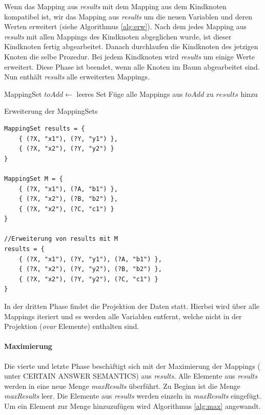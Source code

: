 \documentclass[draft,final]{vutinfth} %
\begin{document}
Wenn das Mapping aus \textit{results} mit dem Mapping aus dem Kindknoten kompatibel ist, wir das Mapping aus \textit{results} um die neuen Variablen und deren Werten erweitert (siehe Algorithmus \ref{alg:erw}). Nach dem jedes Mapping aus \textit{results} mit allen Mappings des Kindknoten abgeglichen wurde, ist dieser Kindknoten fertig abgearbeitet. Danach durchlaufen die Kindknoten des jetzigen Knoten die selbe Prozedur. Bei jedem Kindknoten wird \textit{results} um einige Werte erweitert. Diese Phase ist beendet, wenn alle Knoten im Baum abgearbeitet sind. Nun enthält \textit{results} alle erweiterten Mappings.

\begin{algorithm}
\BlankLine
MappingSet $toAdd \leftarrow$ leeres Set\;
Füge alle Mappings aus $toAdd$ zu $results$ hinzu\;
\caption{Erweiterung der MappingSets}\label{alg:erw}
\end{algorithm}

\begin{lstlisting}[float,caption={Beispiele für Erweiterung der MappingSets},frame=single,label={bspKompMap}]
MappingSet results = { 
	{ (?X, "x1"), (?Y, "y1") }, 
	{ (?X, "x2"), (?Y, "y2") } 
}

MappingSet M = { 
	{ (?X, "x1"), (?A, "b1") }, 
	{ (?X, "x2"), (?B, "b2") },
	{ (?X, "x2"), (?C, "c1") }
}

//Erweiterung von results mit M
results = { 
	{ (?X, "x1"), (?Y, "y1"), (?A, "b1") }, 
	{ (?X, "x2"), (?Y, "y2"), (?B, "b2") },
	{ (?X, "x2"), (?Y, "y2"), (?C, "c1") }
}
\end{lstlisting}

In der dritten Phase findet die Projektion der Daten statt. Hierbei wird über alle Mappings iteriert und es werden alle Variablen entfernt, welche nicht in der Projektion (\textit{ovar} Elemente) enthalten sind. 

\paragraph{Maximierung} \label{maxMapPar}
Die vierte und letzte Phase beschäftigt sich mit der Maximierung der Mappings (\cite{DBLP:conf/www/AhmetajFPSS15} unter CERTAIN ANSWER SEMANTICS) aus \textit{results}. Alle Elemente aus \textit{results} werden in eine neue Menge \textit{maxResults} überführt. Zu Beginn ist die Menge \textit{maxResults} leer. Die Elemente aus \textit{results} werden einzeln in \textit{maxResults} eingefügt. Um ein Element zur Menge hinzuzufügen wird Algorithmus \ref{alg:max} angewandt.
\end{document}
